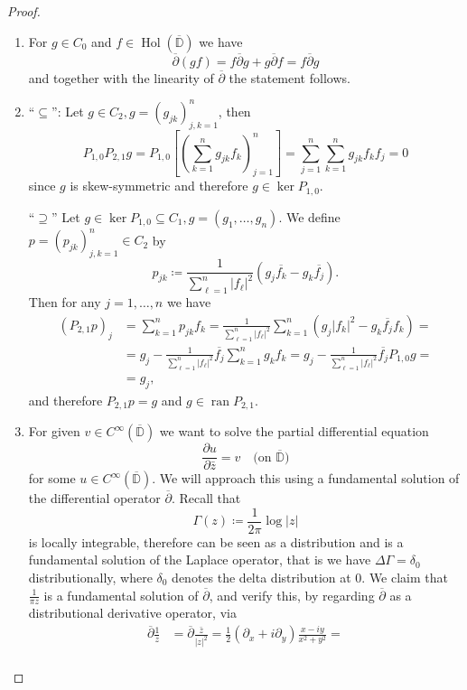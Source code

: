 \documentclass[letterpaper, 11pt]{article}
\newcommand{\D}{\mathbb{D}}
\newcommand{\1}{\mathds{1}}
\newcommand{\cl}[1]{\overline{#1}}
\newcommand{\wirtzbar}{\overline{\partial}}
\DeclareMathOperator*{\ran}{ran}
\DeclareMathOperator*{\Hol}{Hol}
\theoremstyle{definition}
\begin{document}
\begin{proof}{\ }
  \begin{enumerate}
    \item For $g \in C_0$ and $f \in \Hol(\cl{\D})$ we have
    $$ \wirtzbar (gf) = f \wirtzbar g + g \wirtzbar f = f \wirtzbar g $$
    and together with the linearity of $\wirtzbar$ the statement follows.
    \item ``$\subseteq$'': Let $g \in C_2, g = (g_{jk})_{j,k=1}^n$, then
    $$ P_{1,0} P_{2,1} g = P_{1,0} \left[ \left( \sum_{k=1}^n g_{jk} f_k \right)_{j=1}^n \right] = \sum_{j=1}^n \sum_{k=1}^n g_{jk} f_k f_j = 0 $$
    since $g$ is skew-symmetric and therefore $g \in \ker P_{1,0}$.

    ``$\supseteq$'' Let $g \in \ker P_{1,0} \subseteq C_1, g = (g_1, \dots, g_n)$. We define $p = (p_{jk})_{j,k=1}^n \in C_2$ by
    $$ p_{jk} \coloneqq \frac{1}{\displaystyle\sum_{\ell=1}^n \vert f_\ell \vert^2} (g_j \overline{f_k} - g_k \overline{f_j}). $$
    Then for any $j=1,\dots,n$ we have
    \begin{align*}
      (P_{2,1} p)_j &= \sum_{k=1}^n p_{jk} f_k = \frac{1}{\displaystyle\sum_{\ell=1}^n \vert f_\ell \vert^2} \sum_{k=1}^n (g_j \vert f_k \vert^2 - g_k \overline{f_j} f_k) = \\
      &= g_j - \frac{1}{\displaystyle\sum_{\ell=1}^n \vert f_\ell \vert^2} \overline{f_j} \sum_{k=1}^n g_k f_k = g_j - \frac{1}{\displaystyle\sum_{\ell=1}^n \vert f_\ell \vert^2} \overline{f_j} P_{1,0} g = \\
      &= g_j,
    \end{align*}
    and therefore $P_{2,1}p = g$ and $g \in \ran P_{2,1}$.
    \item For given $v \in C^\infty(\cl{\D})$ we want to solve the partial differential equation
    $$ \frac{\partial u}{\partial \bar{z}} = v \quad \textrm{(on $\cl\D$)} $$
    for some $u \in C^\infty(\cl{\D})$. We will approach this using a fundamental solution of the differential operator $\wirtzbar$. Recall that
    $$ \Gamma(z) \coloneqq \frac{1}{2 \pi} \log \vert z \vert $$
    is locally integrable, therefore can be seen as a distribution and is a fundamental solution of the Laplace operator, that is we have $\Delta \Gamma = \delta_0$ distributionally, where $\delta_0$ denotes the delta distribution at 0. We claim that $\frac{1}{\pi z}$ is a fundamental solution of $\wirtzbar$, and verify this, by regarding $\wirtzbar$ as a distributional derivative operator, via
    \begin{align*}
      \wirtzbar \frac{1}{z} &= \wirtzbar \frac{\bar{z}}{\vert z \vert^2} = \frac{1}{2} (\partial_x + i \partial_y) \frac{x - i y}{x^2 + y^2} = \\

\end{align*}
\end{enumerate}
\end{proof}
\end{document}
